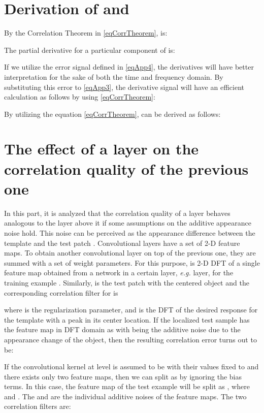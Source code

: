 \documentclass[journal]{IEEEtran}
\begin{document}
\section{Derivation of  and }
\label{secAppendix1}
By the Correlation Theorem in \eqref{eqCorrTheorem},  is:

The partial derivative for a particular component of  is:
\footnotesize


\normalsize
If we utilize the error signal  defined in \eqref{eqApp4}, the derivatives will have better interpretation for the sake of both the time and frequency domain. By substituting this error to \eqref{eqApp3}, the derivative signal will have an efficient calculation as follows by using \eqref{eqCorrTheorem}:

By utilizing the equation \eqref{eqCorrTheorem},  can be derived as follows:


\section{The effect of a layer on the correlation quality of the previous one}
\label{Appendix2}
In this part, it is analyzed that the correlation quality of a layer behaves analogous to the layer above it if some assumptions on the additive appearance noise hold. This noise can be perceived as the appearance difference between the template  and the test patch . Convolutional layers have a set of 2-D feature maps. To obtain another convolutional layer on top of the previous one, they are summed with a set of weight parameters. For this purpose,  is 2-D DFT of a single feature map obtained from a network in a certain layer, \emph{e.g.}  layer, for the training example . Similarly,  is the test patch with the centered object and the corresponding correlation filter for  is

where  is the regularization parameter, and  is the DFT of the desired response  for the template  with a peak in its center location. If the localized test sample  has the feature map in DFT domain as  with  being the additive noise due to the appearance change of the object, then the resulting correlation error turns out to be:


If the convolutional kernel at level  is assumed to be  with their values fixed to  and there exists only two feature maps, then we can split  as  by ignoring the bias terms. In this case, the feature map of the test example  will be split as , where  and . The  and  are the individual additive noises of the feature maps. The two correlation filters are:
\end{document}
